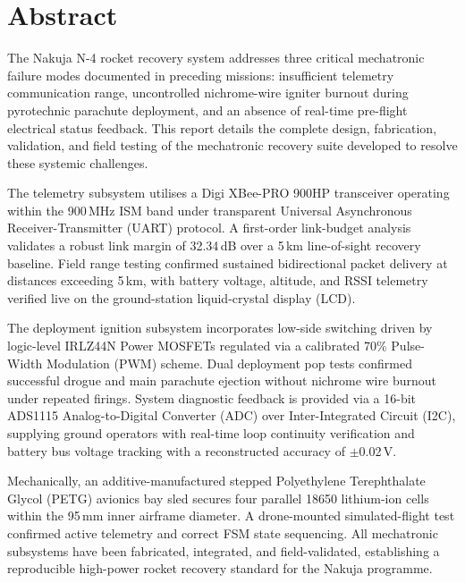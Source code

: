 \section*{Abstract}

The Nakuja N-4 rocket recovery system addresses three critical mechatronic
failure modes documented in preceding missions: insufficient telemetry
communication range, uncontrolled nichrome-wire igniter burnout during
pyrotechnic parachute deployment, and an absence of real-time pre-flight
electrical status feedback. This report details the complete design, fabrication,
validation, and field testing of the mechatronic recovery suite developed to
resolve these systemic challenges.

The telemetry subsystem utilises a Digi XBee-PRO 900HP transceiver operating
within the 900\,MHz ISM band under transparent Universal Asynchronous
Receiver-Transmitter (UART) protocol. A first-order link-budget analysis
validates a robust link margin of 32.34\,dB over a 5\,km line-of-sight recovery
baseline. Field range testing confirmed sustained bidirectional packet delivery at
distances exceeding 5\,km, with battery voltage, altitude, and RSSI telemetry
verified live on the ground-station liquid-crystal display (LCD).

The deployment ignition subsystem incorporates low-side switching driven by
logic-level IRLZ44N Power MOSFETs regulated via a calibrated 70\% Pulse-Width
Modulation (PWM) scheme. Dual deployment pop tests confirmed successful drogue
and main parachute ejection without nichrome wire burnout under repeated
firings. System diagnostic feedback is provided via a 16-bit ADS1115
Analog-to-Digital Converter (ADC) over Inter-Integrated Circuit (I2C),
supplying ground operators with real-time loop continuity verification and
battery bus voltage tracking with a reconstructed accuracy of $\pm$0.02\,V.

Mechanically, an additive-manufactured stepped Polyethylene Terephthalate
Glycol (PETG) avionics bay sled secures four parallel 18650 lithium-ion cells
within the 95\,mm inner airframe diameter. A drone-mounted simulated-flight
test confirmed active telemetry and correct FSM state sequencing. All
mechatronic subsystems have been fabricated, integrated, and field-validated,
establishing a reproducible high-power rocket recovery standard for the Nakuja
programme.

